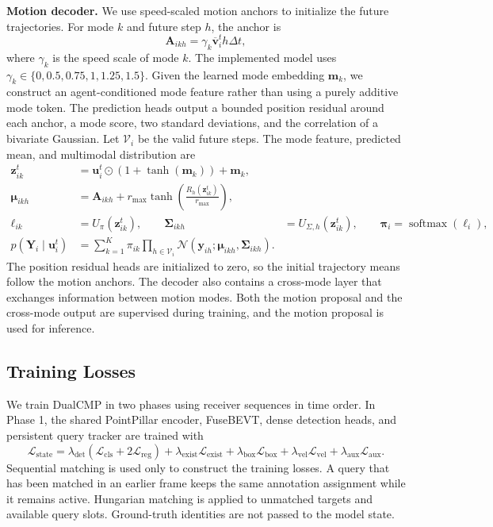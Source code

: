 \documentclass[lettersize,journal]{IEEEtran}
\begin{document}
\textbf{Motion decoder.} We use speed-scaled motion anchors to initialize the future trajectories. For mode \(k\) and future step \(h\), the anchor is
\[
\mathbf{A}_{ikh}=\gamma_k\overline{\mathbf{v}}_i^t h\Delta t,
\tag{9}
\]
where \(\gamma_k\) is the speed scale of mode \(k\). The implemented model uses \(\gamma_k\in\{0,0.5,0.75,1,1.25,1.5\}\). Given the learned mode embedding \(\mathbf{m}_k\), we construct an agent-conditioned mode feature rather than using a purely additive mode token. The prediction heads output a bounded position residual around each anchor, a mode score, two standard deviations, and the correlation of a bivariate Gaussian. Let \(\mathcal{V}_i\) be the valid future steps. The mode feature, predicted mean, and multimodal distribution are
\[
\begin{aligned}
\mathbf{z}_{ik}^t
&=\mathbf{u}_i^t\odot\left(1+\tanh(\mathbf{m}_k)\right)+\mathbf{m}_k,\\
\boldsymbol{\mu}_{ikh}
&=\mathbf{A}_{ikh}+r_{\max}\tanh
\left(\frac{R_h(\mathbf{z}_{ik}^t)}{r_{\max}}\right),\\
\ell_{ik}
&=U_\pi(\mathbf{z}_{ik}^t),
\qquad
\boldsymbol{\Sigma}_{ikh}
&=U_{\Sigma,h}(\mathbf{z}_{ik}^t),
\qquad
\boldsymbol{\pi}_i=\operatorname{softmax}(\boldsymbol{\ell}_i),\\
p(\mathbf{Y}_i\mid\mathbf{u}_i^t)
&=\sum_{k=1}^{K}\pi_{ik}
\prod_{h\in\mathcal{V}_i}
\mathcal{N}
\left(\mathbf{y}_{ih};
\boldsymbol{\mu}_{ikh},\boldsymbol{\Sigma}_{ikh}\right).
\end{aligned}
\tag{10}
\]
The position residual heads are initialized to zero, so the initial trajectory means follow the motion anchors. The decoder also contains a cross-mode layer that exchanges information between motion modes. Both the motion proposal and the cross-mode output are supervised during training, and the motion proposal is used for inference.

\subsection{Training Losses}

We train DualCMP in two phases using receiver sequences in time order. In Phase 1, the shared PointPillar encoder, FuseBEVT, dense detection heads, and persistent query tracker are trained with
\[
\mathcal{L}_{\mathrm{state}}=
\lambda_{\mathrm{det}}(\mathcal{L}_{\mathrm{cls}}+2\mathcal{L}_{\mathrm{reg}})
+\lambda_{\mathrm{exist}}\mathcal{L}_{\mathrm{exist}}
+\lambda_{\mathrm{box}}\mathcal{L}_{\mathrm{box}}
+\lambda_{\mathrm{vel}}\mathcal{L}_{\mathrm{vel}}
+\lambda_{\mathrm{aux}}\mathcal{L}_{\mathrm{aux}}.
\tag{11}
\]
Sequential matching is used only to construct the training losses. A query that has been matched in an earlier frame keeps the same annotation assignment while it remains active. Hungarian matching is applied to unmatched targets and available query slots. Ground-truth identities are not passed to the model state.
\end{document}

